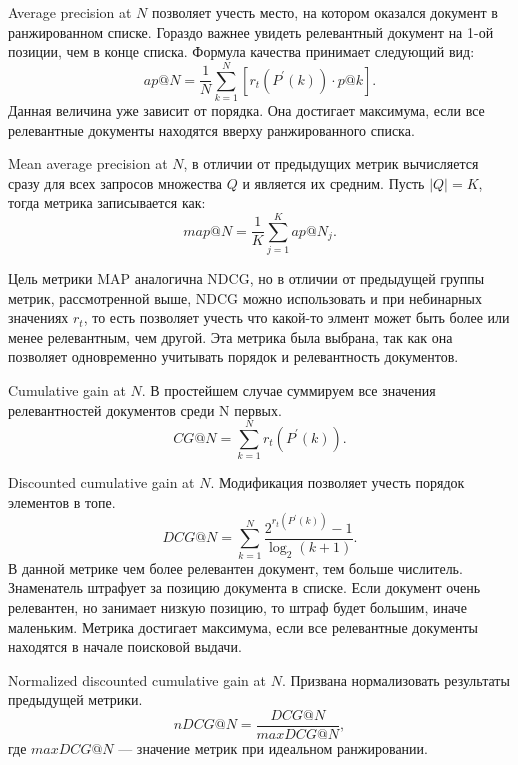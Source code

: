 Average precision at $N$ позволяет учесть место, на котором оказался документ в ранжированном списке. Гораздо важнее увидеть релевантный документ на 1-ой позиции, чем в конце списка. Формула качества принимает
следующий вид: 
\begin{equation}
	\label{eq:map2}
	ap @ N=\frac{1}{N} \sum_{k=1}^N [r_t(P^{\prime}(k)) \cdot p@k].
\end{equation}
Данная величина уже зависит от порядка. Она достигает максимума, если все релевантные документы находятся вверху ранжированного списка.

Mean average precision at $N$, в отличии от предыдущих метрик вычисляется сразу для всех запросов множества $Q$ и является их средним. Пусть $|Q| = K$, тогда метрика записывается как:
\begin{equation}
	\label{eq:map3}
	map @ N=\frac{1}{K} \sum_{j=1}^K ap @ N_j.
\end{equation}

Цель метрики MAP аналогична NDCG, но в отличии от предыдущей группы метрик, рассмотренной выше, NDCG можно использовать и при небинарных значениях $r_t$, то есть позволяет учесть что какой-то элмент может быть более или менее релевантным, чем другой. Эта метрика была выбрана, так как она позволяет одновременно учитывать порядок и релевантность документов.

Cumulative gain at $N$. В простейшем случае суммируем все значения релевантностей документов среди N первых.
\begin{equation}
	\label{eq:ndcg1}
	CG @ N= \sum_{k=1}^N r_t(P^{\prime}(k)).
\end{equation}

Discounted cumulative gain at $N$. Модификация позволяет учесть порядок элементов в топе.
\begin{equation}
	\label{eq:ndcg2}
	D C G @ N=\sum_{k=1}^N \frac{2^{r_t(P^{\prime}(k))}-1}{\log _2(k+1)}.
\end{equation}
В данной метрике чем более релевантен документ, тем больше числитель. Знаменатель штрафует за позицию документа в списке. Если документ очень релевантен, но занимает низкую позицию, то штраф будет большим, иначе маленьким. Метрика достигает максимума, если все релевантные документы находятся в начале поисковой выдачи.

Normalized discounted cumulative gain at $N$. Призвана нормализовать результаты предыдущей метрики.
\begin{equation}
	\label{eq:ndcg3}
	nD C G @ N=\frac{D C G @ N}{maxD C G @ N},
\end{equation}
где $maxD C G @ N$ --- значение метрик при идеальном ранжировании.

